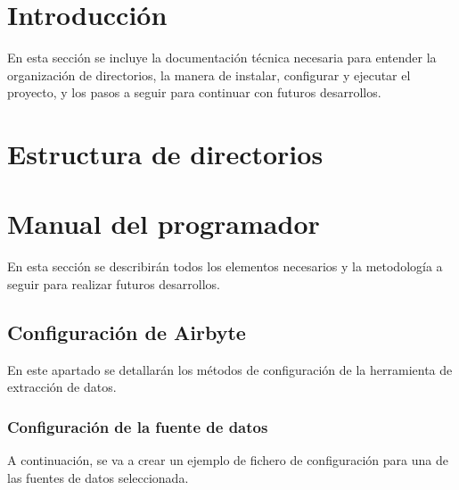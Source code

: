 
\section{Introducción}

En esta sección se incluye la documentación técnica necesaria para entender la organización de directorios, la manera de instalar, configurar y ejecutar el proyecto, y los pasos a seguir para continuar con futuros desarrollos.


\section{Estructura de directorios}

\section{Manual del programador}

En esta sección se describirán todos los elementos necesarios y la metodología a seguir para realizar futuros desarrollos.

\subsection{Configuración de Airbyte}

En este apartado se detallarán los métodos de configuración de la herramienta de extracción de datos.

\subsubsection{Configuración de la fuente de datos}

A continuación, se va a crear un ejemplo de fichero de configuración para una de las fuentes de datos seleccionada.

